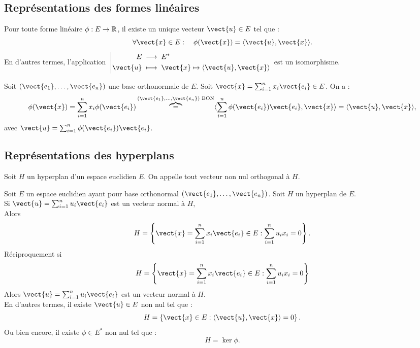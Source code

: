 \documentclass{book}
\begin{document}
\subsection{Représentations des formes linéaires}

\begin{Proposition}
Pour toute forme linéaire $\phi : E \to \mathbb{R}$, il existe un unique vecteur $\vect{u} \in E$ tel que :
$$ \forall \vect{x} \in E:\quad  \phi(\vect{x}) =\PS{ \vect{u}}{ \vect{x}} .$$
En d'autres termes, l'application $\Fonction{}{E}{E^*}{\vect{u}}{\vect{x} \mapsto \PS{ \vect{u}}{ \vect{x}}} $
est un isomorphisme.
\end{Proposition}
\begin{Demonstration}
 Soit $(\vect{e_1},\dots,\vect{e_n})$ une base orthonormale de $E$. 
Soit $\vect{x}=\sum_{i=1}^n x_i \vect{e_i}  \in E$. 
 On a :
$$ \phi(\vect{x})=\sum_{i=1}^n x_i \phi(\vect{e_i})\overbrace{=}^{(\vect{e_1},\dots,\vect{e_n})\text{ BON}}\PS{\sum_{i=1}^n \phi(\vect{e_i})\vect{e_i} }{\vect{x}}=\PS{\vect{u} }{\vect{x}},$$ 
avec $ \vect{u}=\sum_{i=1}^n \phi(\vect{e_i})\vect{e_i}$.
\end{Demonstration}


\subsection{Représentations des hyperplans}
\begin{Definition}
Soit $H$ un hyperplan d'un espace euclidien $ E$. On appelle  tout vecteur non nul orthogonal à $ H$.
\end{Definition}


\begin{Proposition}
 Soit $ E$ un espace euclidien ayant pour base orthonormal $(\vect{e_1},\dots,\vect{e_n})$.
Soit $H$ un hyperplan de $E$. \\
Si $\vect{u}=\sum_{i=1}^n u_i \vect{e_i}$ est un vecteur normal à $H$,\\
Alors 
$$H=\left\{\vect{x}=\sum_{i=1}^n x_i \vect{e_i} \in E:   \sum_{i=1}^n u_i x_i=0 \right\}.$$
Réciproquement si 
$$H=\left\{\vect{x}=\sum_{i=1}^n x_i \vect{e_i} \in E:   \sum_{i=1}^n u_i x_i=0 \right\}$$
Alors  $\vect{u}=\sum_{i=1}^n u_i \vect{e_i}$ est un vecteur normal à $H$.\\
En d'autres termes, il existe  $\vect{u}\in E$ non nul tel que  :
$$H=\left\{\vect{x}\in E:   \PS{\vect{u}}{\vect{x}}=0 \right\}.$$
Ou bien encore, il existe $\phi \in E^*$ non nul tel que :
$$H=\ker \phi.$$ 
\end{Proposition}


\end{document}

